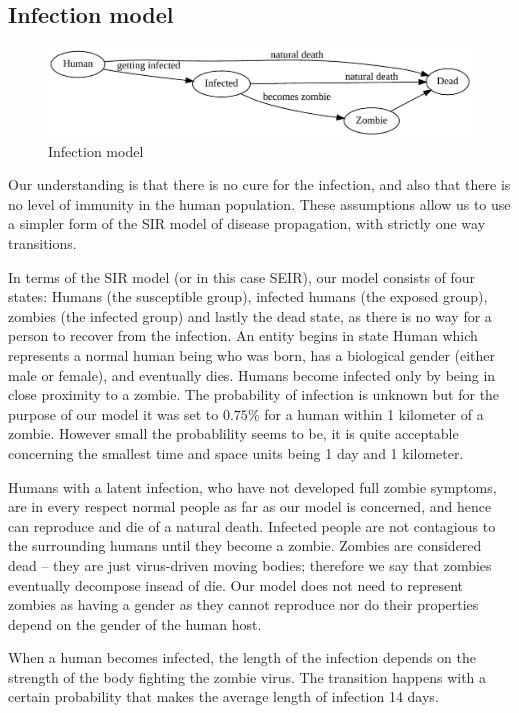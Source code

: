 \documentclass[a4paper]{article}
\begin{document}
\subsection{Infection model}

\begin{figure}[ht]
        \centering
        \includegraphics[width=\textwidth]{model}
        \caption{Infection model}
\end{figure}

Our understanding is that there is no cure for the infection, and also that there is no level of immunity in the human population.
These assumptions allow us to use a simpler form of the SIR model of disease propagation, with strictly one way transitions.

In terms of the SIR model (or in this case SEIR), our model consists of four states: Humans (the susceptible group), infected humans (the exposed group), zombies (the infected group) and lastly the dead state, as there is no way for a person to recover from the infection.
An entity begins in state Human which represents a normal human being who was born, has a biological gender (either male or female), and eventually dies.
Humans become infected only by being in close proximity to a zombie.
The probability of infection is unknown but for the purpose of our model it was set to $0.75\%$ for a human within 1 kilometer of a zombie.
However small the probablility seems to be, it is quite acceptable concerning the smallest time and space units being 1 day and 1 kilometer.

Humans with a latent infection, who have not developed full zombie symptoms, are in every respect normal people as far as our model is concerned, and hence can reproduce and die of a natural death.
Infected people are not contagious to the surrounding humans until they become a zombie.
Zombies are considered dead -- they are just virus-driven moving bodies; therefore we say that zombies eventually decompose insead of die.
Our model does not need to represent zombies as having a gender as they cannot reproduce nor do their properties depend on the gender of the human host.

When a human becomes infected, the length of the infection depends on the strength of the body fighting the zombie virus.
The transition happens with a certain probability that makes the average length of infection 14 days.
\end{document}
